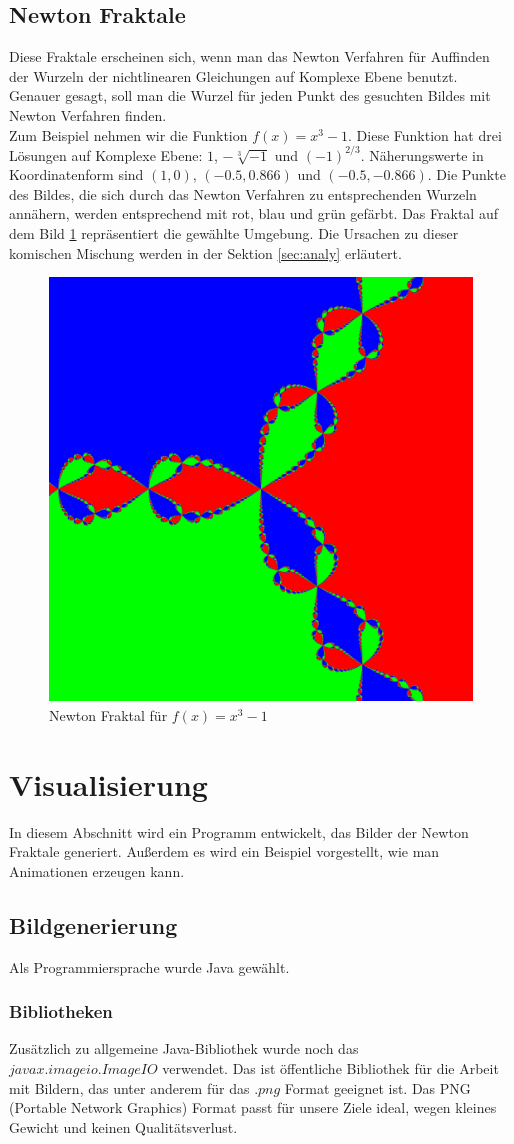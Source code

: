 \documentclass[a4paper,12pt]{llncs}
\numberwithin{equation}{section}
\begin{document}
\subsection{Newton Fraktale}
Diese Fraktale erscheinen sich, wenn man das Newton Verfahren für Auffinden der Wurzeln der nichtlinearen Gleichungen auf Komplexe Ebene benutzt.
Genauer gesagt, soll man die Wurzel für jeden Punkt des gesuchten Bildes mit Newton Verfahren finden.\\
Zum Beispiel nehmen wir die Funktion $f(x) = x^3 -1$. Diese Funktion hat drei Lösungen auf Komplexe Ebene: $1$, $-\sqrt[3]{-1}$ und $(-1)^{2/3}$. Näherungswerte in Koordinatenform sind $(1, 0)$, $(-0.5, 0.866)$ und $(-0.5, -0.866)$. Die Punkte des Bildes, die sich durch das Newton Verfahren zu entsprechenden Wurzeln annähern, werden entsprechend mit rot, blau und grün gefärbt.
Das Fraktal auf dem Bild \ref{fig:output3_0} repräsentiert die gewählte Umgebung.
Die Ursachen zu dieser komischen Mischung werden in der Sektion \ref{sec:analy} erläutert.
\begin{figure}[ht]   
	\centering
	\includegraphics[width=.5\linewidth]{figures/output3_0}
	\caption{Newton Fraktal für $f(x)=x^3-1$ }
	\label{fig:output3_0}
\end{figure}
\section{Visualisierung}\label{sec:vis}
In diesem Abschnitt wird ein Programm entwickelt, das Bilder der Newton Fraktale generiert.
Außerdem es wird ein Beispiel vorgestellt, wie man Animationen erzeugen kann.
\subsection{Bildgenerierung}\label{subs:vis:bild}
Als Programmiersprache wurde Java gewählt.
\subsubsection{Bibliotheken}
Zusätzlich zu allgemeine Java-Bibliothek wurde noch das\\ $javax$.$imageio$.$ImageIO$ verwendet.
Das ist öffentliche Bibliothek für die Arbeit mit Bildern, das unter anderem für das .$png$ Format geeignet ist.
Das PNG (Portable Network Graphics) Format passt für unsere Ziele ideal, wegen kleines Gewicht und keinen Qualitätsverlust.
\end{document}
